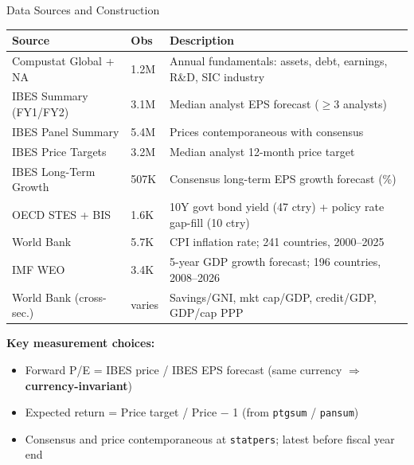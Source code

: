 \documentclass[aspectratio=169, 11pt]{beamer}
\begin{document}
\begin{frame}{Data Sources and Construction}
\vspace{-0.3cm}
\scriptsize
\begin{tabular}{@{}llp{7.5cm}@{}}
\toprule
\textbf{Source} & \textbf{Obs} & \textbf{Description} \\
\midrule
Compustat Global + NA & 1.2M & Annual fundamentals: assets, debt, earnings, R\&D, SIC industry \\
IBES Summary (FY1/FY2) & 3.1M & Median analyst EPS forecast ($\geq$3 analysts) \\
IBES Panel Summary & 5.4M & Prices contemporaneous with consensus \\
IBES Price Targets & 3.2M & Median analyst 12-month price target \\
IBES Long-Term Growth & 507K & Consensus long-term EPS growth forecast (\%) \\
\midrule
OECD STES + BIS & 1.6K & 10Y govt bond yield (47 ctry) + policy rate gap-fill (10 ctry) \\
World Bank & 5.7K & CPI inflation rate; 241 countries, 2000--2025 \\
IMF WEO & 3.4K & 5-year GDP growth forecast; 196 countries, 2008--2026 \\
World Bank (cross-sec.) & varies & Savings/GNI, mkt cap/GDP, credit/GDP, GDP/cap PPP \\
\bottomrule
\end{tabular}

\vspace{0.05cm}
\textbf{Key measurement choices:}
\begin{itemize}\setlength\itemsep{0pt}
\item Forward P/E = IBES price / IBES EPS forecast (same currency $\Rightarrow$ \textbf{currency-invariant})
\item Expected return = Price target / Price $-$ 1 (from \texttt{ptgsum} / \texttt{pansum})
\item Consensus and price contemporaneous at \texttt{statpers}; latest before fiscal year end
\end{itemize}
\end{frame}
\end{document}
